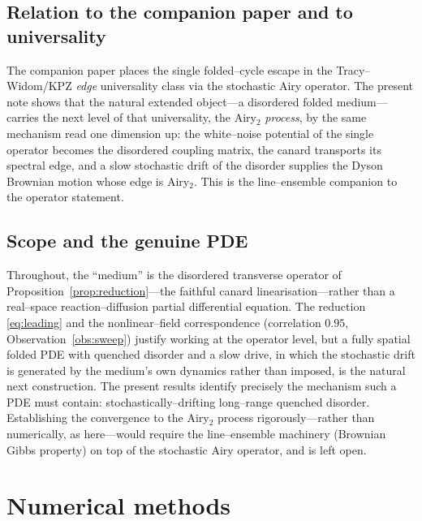 \documentclass[11pt,reqno]{amsart}
\theoremstyle{plain}
\theoremstyle{definition}
\theoremstyle{remark}
\begin{document}
\subsection*{Relation to the companion paper and to universality} The companion paper places
the single folded--cycle escape in the Tracy--Widom/KPZ \emph{edge} universality class via
the stochastic Airy operator. The present note shows that the natural extended object---a
disordered folded medium---carries the next level of that universality, the Airy$_2$
\emph{process}, by the same mechanism read one dimension up: the white--noise potential of
the single operator becomes the disordered coupling matrix, the canard transports its
spectral edge, and a slow stochastic drift of the disorder supplies the Dyson Brownian motion
whose edge is Airy$_2$. This is the line--ensemble companion to the operator statement.

\subsection*{Scope and the genuine PDE} Throughout, the ``medium'' is the disordered
transverse operator of Proposition~\ref{prop:reduction}---the faithful canard
linearisation---rather than a real--space reaction--diffusion partial differential equation.
The reduction \eqref{eq:leading} and the nonlinear--field correspondence (correlation
$0.95$, Observation~\ref{obs:sweep}) justify working at the operator level, but a fully
spatial folded PDE with quenched disorder and a slow drive, in which the stochastic drift is
generated by the medium's own dynamics rather than imposed, is the natural next construction.
The present results identify precisely the mechanism such a PDE must contain:
stochastically--drifting long--range quenched disorder. Establishing the convergence to the
Airy$_2$ process rigorously---rather than numerically, as here---would require the
line--ensemble machinery (Brownian Gibbs property) on top of the stochastic Airy operator,
and is left open.

\section{Numerical methods}\label{sec:methods}
\end{document}
